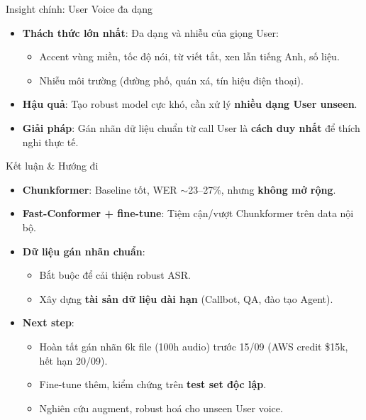 \documentclass{beamer}
\begin{document}
\begin{frame}{Insight chính: User Voice đa dạng}
    \begin{itemize}
        \item \textbf{Thách thức lớn nhất}: Đa dạng và nhiễu của giọng User:
            \begin{itemize}
                \item Accent vùng miền, tốc độ nói, từ viết tắt, xen lẫn tiếng Anh, số liệu.
                \item Nhiễu môi trường (đường phố, quán xá, tín hiệu điện thoại).
            \end{itemize}
        \item \textbf{Hậu quả}: Tạo robust model cực khó, cần xử lý \textbf{nhiều dạng User unseen}.
        \item \textbf{Giải pháp}: Gán nhãn dữ liệu chuẩn từ call User là \textbf{cách duy nhất} để thích nghi thực tế.
    \end{itemize}
\end{frame}

\begin{frame}{Kết luận & Hướng đi}
    \begin{itemize}
        \item \textbf{Chunkformer}: Baseline tốt, WER $\sim$23--27\%, nhưng \textbf{không mở rộng}.
        \item \textbf{Fast-Conformer + fine-tune}: Tiệm cận/vượt Chunkformer trên data nội bộ.
        \item \textbf{Dữ liệu gán nhãn chuẩn}: 
            \begin{itemize}
                \item Bắt buộc để cải thiện robust ASR.
                \item Xây dựng \textbf{tài sản dữ liệu dài hạn} (Callbot, QA, đào tạo Agent).
            \end{itemize}
        \item \textbf{Next step}:
            \begin{itemize}
                \item Hoàn tất gán nhãn 6k file (100h audio) trước 15/09 (AWS credit \$15k, hết hạn 20/09).
                \item Fine-tune thêm, kiểm chứng trên \textbf{test set độc lập}.
                \item Nghiên cứu augment, robust hoá cho unseen User voice.
            \end{itemize}
    \end{itemize}
\end{frame}
\end{document}

